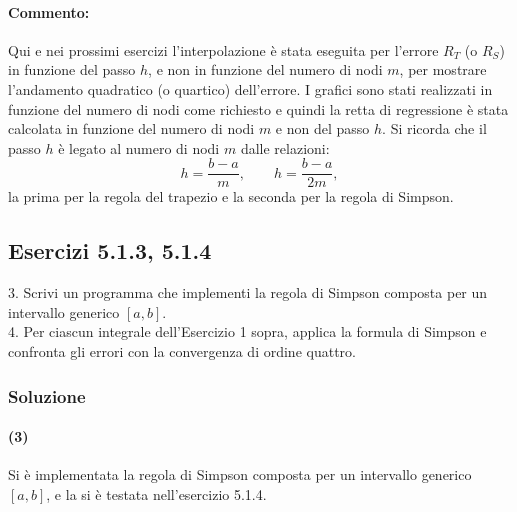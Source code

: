 \documentclass[letterpaper, 12pt]{article}
\begin{document}
\paragraph{Commento: } Qui e nei prossimi esercizi l'interpolazione è stata eseguita per l'errore $R_T$ (o $R_S$)
in funzione del passo $h$, e non in funzione del numero di nodi $m$, per mostrare l'andamento quadratico 
(o quartico) dell'errore. I grafici sono stati realizzati in funzione del numero di nodi come richiesto
e quindi la retta di regressione è stata calcolata in funzione del numero di nodi $m$ e non del passo $h$.
Si ricorda che il passo $h$ è legato al numero di nodi $m$ dalle relazioni:
\begin{equation}
    h = \frac{b-a}{m}, \qquad h = \frac{b-a}{2m},
\end{equation}
la prima per la regola del trapezio e la seconda per la regola di Simpson.

\subsection{Esercizi 5.1.3, 5.1.4}
3. Scrivi un programma che implementi la regola di Simpson composta per un intervallo generico $[a,b]$. \\
4. Per ciascun integrale dell'Esercizio 1 sopra, applica la formula di Simpson e confronta gli errori con 
la convergenza di ordine quattro.

\subsubsection{Soluzione}
\paragraph{(3) } Si è implementata la regola di Simpson composta per un intervallo generico $[a,b]$,
e la si è testata nell'esercizio 5.1.4. \\
\end{document}
